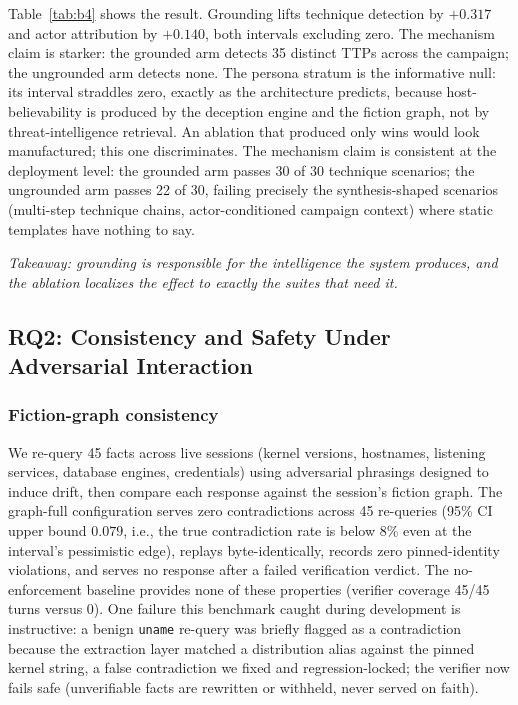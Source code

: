Table~\ref{tab:b4} shows the result. Grounding lifts technique detection
by $+0.317$ and actor attribution by $+0.140$, both intervals excluding
zero. The mechanism claim is starker: the grounded arm detects 35 distinct
TTPs across the campaign; the ungrounded arm detects none. The persona
stratum is the informative null: its interval straddles zero, exactly as
the architecture predicts, because host-believability is produced by the
deception engine and the fiction graph, not by threat-intelligence
retrieval. An ablation that produced only wins would look manufactured;
this one discriminates. The mechanism claim is consistent at the
deployment level: the grounded arm passes 30 of 30 technique scenarios;
the ungrounded arm passes 22 of 30, failing precisely the
synthesis-shaped scenarios (multi-step technique chains, actor-conditioned
campaign context) where static templates have nothing to say.

\emph{Takeaway: grounding is responsible for the intelligence the system
produces, and the ablation localizes the effect to exactly the suites
that need it.}

\subsection{RQ2: Consistency and Safety Under Adversarial Interaction}
\label{sec:rq2}

\subsubsection{Fiction-graph consistency}
We re-query 45 facts across live sessions (kernel versions, hostnames,
listening services, database engines, credentials) using adversarial
phrasings designed to induce drift, then compare each response against
the session's fiction graph. The graph-full configuration serves zero
contradictions across 45 re-queries (95\% CI upper bound $0.079$, i.e.,
the true contradiction rate is below 8\% even at the interval's
pessimistic edge), replays byte-identically, records
zero pinned-identity violations, and serves no response after a failed
verification verdict. The no-enforcement baseline provides none of these
properties (verifier coverage 45/45 turns versus 0). One failure this
benchmark caught during development is instructive: a benign
\texttt{uname} re-query was briefly flagged as a contradiction because
the extraction layer matched a distribution alias against the pinned
kernel string, a false contradiction we fixed and regression-locked; the
verifier now fails safe (unverifiable facts are rewritten or withheld,
never served on faith).

